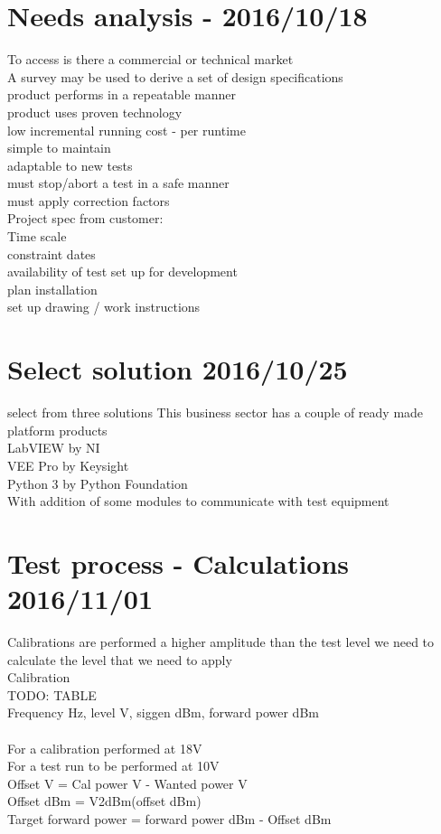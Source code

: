 \section{Needs analysis - 2016/10/18}
To access is there a commercial or technical market\\
A survey may be used to derive a set of design specifications\\
product performs in a repeatable manner\\
product uses proven technology\\
low incremental running cost - per runtime\\
simple to maintain\\
adaptable to new tests\\
must stop/abort a test in a safe manner\\
must apply correction factors\\

Project spec from customer:\\
Time scale\\
constraint dates\\
availability of test set up for development\\
plan installation\\
set up drawing / work instructions\\

\section{Select solution 2016/10/25}
select from three solutions
This business sector has a couple of ready made platform products\\
LabVIEW by NI\\
VEE Pro by Keysight\\
Python 3 by Python Foundation\\
  With addition of some modules to communicate with test equipment\\

\section{Test process - Calculations 2016/11/01}
Calibrations are performed a higher amplitude than the test level we need to calculate the level that we need to apply\\
Calibration\\
TODO: TABLE\\
Frequency Hz, level V, siggen dBm, forward power dBm\\
\\
For a calibration performed at 18V\\
For a test run to be performed at 10V\\
Offset V = Cal power V - Wanted power V\\
Offset dBm = V2dBm(offset dBm)\\
Target forward power = forward power dBm - Offset dBm\\

